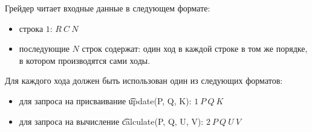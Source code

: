 Грейдер читает входные данные в следующем формате:
\begin{itemize}
\item строка $1$: $R\ C\ N$
\item последующие $N$ строк содержат: один ход в каждой строке в том же порядке, в котором производятся сами ходы.
\end{itemize}

Для каждого хода должен быть использован один из следующих форматов:
\begin{itemize}
\item для запроса на присваивание \t{update(P, Q, K)}: $1\ P\ Q\ K$
\item для запроса на вычисление \t{calculate(P, Q, U, V)}: $2\ P\ Q\ U\ V$
\end{itemize}
